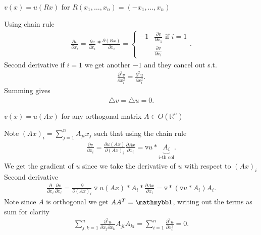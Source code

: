 \begin{exercise}[c]
 $v(x) = u(Rx)$ for $R(x_{1},\ldots,x_n) = (-x_{1},\ldots ,x_n)$ 
\end{exercise}
\begin{solution}
 Using chain rule
 \begin{align*}
   \frac{\partial v}{\partial x_i}  = \frac{\partial v}{\partial x_i} *\frac{\partial (Rx)}{\partial x_i}  = \begin{cases}
     -1 &\frac{\partial v}{\partial x_1} \text{ if } i=1\\
    &\frac{\partial v}{\partial x_i} 
   \end{cases}
 .\end{align*}
 Second derivative if $i=1$ we get another $-1$ and they cancel out s.t.
 \begin{align*}
   \frac{\partial ^2 v}{\partial x_i^2}  = \frac{\partial ^2 u}{\partial x_i^2} 
 .\end{align*}
 Summing gives 
 \begin{align*}
  \triangle v = \triangle u = 0
 .\end{align*}
\end{solution}
\begin{exercise}[d]
 $v(x) = u(Ax) $ for any orthogonal matrix $A \in  O(\mathbb{R}^{n} )$ 
\end{exercise}
\begin{solution}
  Note $(Ax)_i = \sum_{j=1}^{n} A_{ji}x_j $ such that using the chain rule 
\begin{align*} 
  \frac{\partial v}{\partial x_i}  = \frac{\partial u(Ax)}{\partial (Ax)_i}\frac{\partial Ax}{\partial x_i}  = \triangledown u *\underbrace{A_i}_{i\text{-th col}}
.\end{align*}
We get the gradient of $u$ since we take the derivative of $u$ with respect to $(Ax)_i$\\[1ex]
Second derivative 
\begin{align*}
  \frac{\partial}{\partial x_i} \frac{\partial v}{\partial x_i} =  \frac{\partial}{\partial (Ax)_i} \triangledown u(Ax) * A_i * \frac{\partial Ax}{\partial x_i}   = \triangledown * (\triangledown u*A_i)A_i 
.\end{align*}
Note since $A$ is orthogonal we get $A A^{T} = \cha $, writing out the terms as sum for clarity 
\begin{align*}
  \sum_{j,k = 1}^{n} \frac{\partial ^2 u}{\partial x_j \partial x_k} A_{ji}A_{ki}  = \sum_{i=1}^{n} \frac{\partial ^2 u }{\partial x_i^2}  = 0
.\end{align*}
\end{solution}
\newpage
